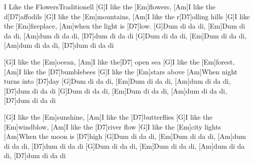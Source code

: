 \documentclass[../main.tex]{subfiles}
\begin{document}
\begin{song}{I Like the Flowers}{Traditionell}{}
[G]I like the [Em]flowers, [Am]I like the d[D7]affodils
[G]I like the [Em]mountains, [Am]I like the r[D7]olling hills
[G]I like the [Em]fireplace, [Am]when the light is [D7]low.
[G]Dum di da di, [Em]Dum di da di, [Am]dum di da di, [D7]dum di da di
[G]Dum di da di, [Em]Dum di da di, [Am]dum di da di, [D7]dum di da di

[G]I like the [Em]ocean, [Am]I like the[D7] open sea
[G]I like the [Em]forest, [Am]I like the [D7]bumblebees
[G]I like the [Em]stars above [Am]When night turns into [D7]day
[G]Dum di da di, [Em]Dum di da di, [Am]dum di da di, [D7]dum di da di
[G]Dum di da di, [Em]Dum di da di, [Am]dum di da di, [D7]dum di da di

[G]I like the [Em]sunshine, [Am]I like the [D7]butterflies
[G]I like the [Em]windblow, [Am]I like the [D7]river flow
[G]I like the [Em]city lights [Am]When the moon is [D7]high
[G]Dum di da di, [Em]Dum di da di, [Am]dum di da di, [D7]dum di da di
[G]Dum di da di, [Em]Dum di da di, [Am]dum di da di, [D7]dum di da di

\end{song}
\end{document}
